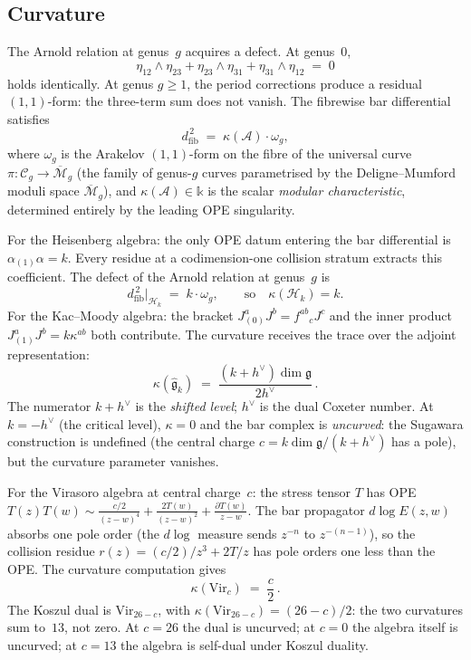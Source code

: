 \documentclass[11pt]{report}
\theoremstyle{definition}
\theoremstyle{remark}
\providecommand{\cA}{\mathcal{A}}
\providecommand{\Bbbk}{\mathbb{k}}
\numberwithin{equation}{section}
\begin{document}
\subsection*{Curvature}

The Arnold relation at genus~$g$ acquires a defect. At genus~$0$,
\[
\eta_{12}\wedge\eta_{23}
+\eta_{23}\wedge\eta_{31}
+\eta_{31}\wedge\eta_{12}
\;=\;0
\]
holds identically. At genus $g\ge 1$, the period corrections
produce a residual $(1,1)$-form: the three-term sum does not vanish.
The fibrewise bar differential satisfies
\begin{equation}\label{eq:pref-curvature}
d_{\mathrm{fib}}^{\,2}\;=\;\kappa(\cA)\cdot\omega_g,
\end{equation}
where $\omega_g$ is the Arakelov $(1,1)$-form on the fibre of the
universal curve $\pi\colon\mathcal C_g\to\overline{\mathcal M}_g$
(the family of genus-$g$ curves parametrised by the
Deligne--Mumford moduli space $\overline{\mathcal M}_g$),
and $\kappa(\cA)\in\Bbbk$ is the scalar \emph{modular
characteristic}, determined entirely by the leading OPE singularity.

For the Heisenberg algebra: the only OPE datum entering the bar
differential is $\alpha_{(1)}\alpha=k$. Every residue at a
codimension-one collision stratum extracts this coefficient. The
defect of the Arnold relation at genus~$g$ is
\[
d_{\mathrm{fib}}^{\,2}\big|_{\mathcal H_k}
\;=\;
k\cdot\omega_g,
\qquad\text{so}\quad
\kappa(\mathcal H_k)=k.
\]
For the Kac--Moody algebra: the bracket
$J^a_{(0)}J^b=f^{ab}{}_{c}J^c$ and the inner product
$J^a_{(1)}J^b=k\kappa^{ab}$ both contribute. The curvature
receives the trace over the adjoint representation:
\[
\kappa(\widehat{\mathfrak g}_k)
\;=\;
\frac{(k+h^\vee)\dim\mathfrak g}{2h^\vee}\,.
\]
The numerator $k+h^\vee$ is the \emph{shifted level}; $h^\vee$ is
the dual Coxeter number. At $k=-h^\vee$ (the critical level),
$\kappa=0$ and the bar complex is \emph{uncurved}: the Sugawara
construction is undefined (the central charge
$c=k\dim\mathfrak g/(k+h^\vee)$ has a pole), but the curvature
parameter vanishes.

For the Virasoro algebra at central charge~$c$: the stress tensor
$T$ has OPE $T(z)T(w)\sim\frac{c/2}{(z-w)^4}
+\frac{2T(w)}{(z-w)^2}+\frac{\partial T(w)}{z-w}$.
The bar propagator $d\log E(z,w)$ absorbs one pole order
(the $d\log$ measure sends $z^{-n}$ to $z^{-(n-1)}$), so the
collision residue $r(z)=(c/2)/z^3+2T/z$ has pole orders one
less than the OPE. The curvature computation gives
\[
\kappa(\mathrm{Vir}_c)\;=\;\frac{c}{2}\,.
\]
The Koszul dual is $\mathrm{Vir}_{26-c}$, with
$\kappa(\mathrm{Vir}_{26-c})=(26-c)/2$: the two curvatures
sum to~$13$, not zero. At $c=26$ the dual is uncurved; at
$c=0$ the algebra itself is uncurved; at $c=13$ the algebra
is self-dual under Koszul duality.
\end{document}
